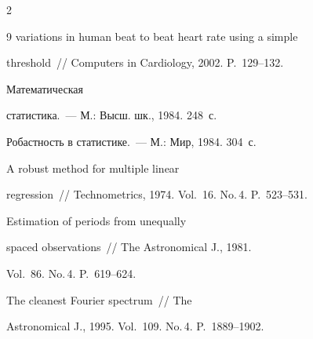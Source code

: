 \begin{multicols}{2}
{{\begin{thebibliography}{9}
variations in human beat to beat heart rate using a simple


threshold~// Computers in Cardiology, 2002. P.~129--132.









Математическая


статистика.~--- М.: Высш. шк., 1984. 248~с.









Робастность в статистике.~--- М.: Мир, 1984. 304~с.









A robust method for multiple linear


regression~// Technometrics, 1974. Vol.~16. No.\,4. P.~523--531.









Estimation of periods from unequally


spaced observations~// The As\-tro\-no\-mi\-cal J., 1981.


Vol.~86. No.\,4. P.~619--624.





\label{end\stat}









The cleanest Fourier spectrum~// The


Astronomical J., 1995. Vol.~109. No.\,4. P.~1889--1902.


\end{thebibliography}





}


}


\end{multicols}


